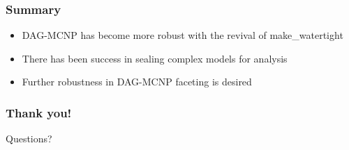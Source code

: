 \documentclass[14pt]{beamer}
\begin{document}
\begin{frame}
\frametitle{Summary}
\begin{itemize}
\item DAG-MCNP has become more robust with the revival of make\_watertight
\vfill
\item There has been success in sealing complex models for analysis
\vfill
\item Further robustness in DAG-MCNP faceting is desired
\end{itemize}
\end{frame}


\begin{frame}
\frametitle{Thank you!}

\begin{center}
Questions?
\end{center}

\end{frame}
\end{document}
